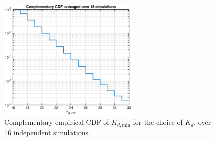 \documentclass[10pt]{article}
\begin{document}
\begin{figure}
 \centering
 \includegraphics[width = 0.6\textwidth]{Kd_min_estimation}
 \caption{Complementary empirical CDF of $K_{d,\mathrm{min}}$ for the choice of $K_d$, over 16 independent simulations.}
 \label{fig:Kd_min_estimation}
\end{figure}


\end{document}
